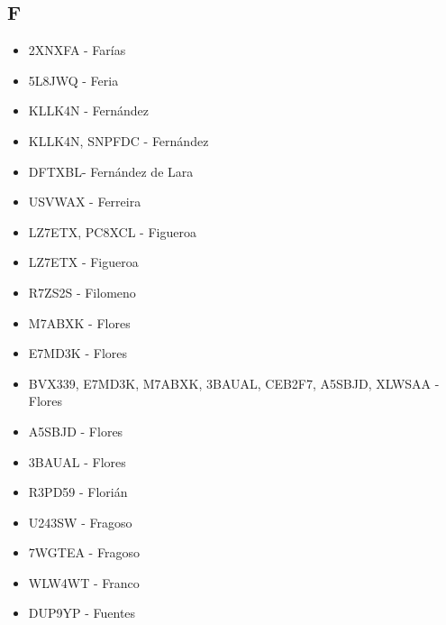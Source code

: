\subsection*{F}
\begin{itemize}[leftmargin=*,nosep]
\item 2XNXFA - Farías
\item 5L8JWQ - Feria
\item KLLK4N - Fernández
\item KLLK4N, SNPFDC - Fernández
\item DFTXBL- Fernández de Lara
\item USVWAX  -  Ferreira
\item LZ7ETX, PC8XCL - Figueroa
\item LZ7ETX - Figueroa
\item R7ZS2S - Filomeno
\item M7ABXK - Flores
\item E7MD3K - Flores
\item BVX339, E7MD3K, M7ABXK, 3BAUAL, CEB2F7, A5SBJD, XLWSAA - Flores
\item A5SBJD  -  Flores
\item 3BAUAL  -  Flores
\item R3PD59 - Florián
\item U243SW - Fragoso
\item 7WGTEA  -  Fragoso
\item WLW4WT - Franco
\item DUP9YP  -  Fuentes
\end{itemize}

